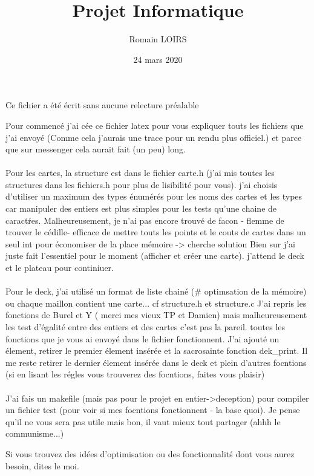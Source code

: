 \documentclass{article}
\title{Projet Informatique}
\author{Romain LOIRS}
\date{24 mars 2020}
\begin{document}
\maketitle
\tableofcontents 

\newpage

Ce fichier a \'et\'e \'ecrit sans aucune relecture pr\'ealable

Pour commenc\'e j'ai c\'ee ce fichier latex pour vous expliquer touts les fichiers que j'ai envoy\'e (Comme cela j'aurais une trace pour un rendu plus officiel.) et parce que sur messenger cela aurait fait (un peu) long.

\paragraph{}
Pour les cartes, la structure est dans le fichier carte.h (j'ai mis toutes les structures dans les fichiers.h pour plus de lisibilit\'e pour vous). j'ai choisis d'utiliser un maximum des types \'enum\'er\'es pour les noms des cartes et les types car manipuler des entiers est plus simples pour les tests qu'une chaine de caract\'res.  Malheureusement, je n'ai pas encore trouv\'e de facon - flemme de trouver le c\'edille- efficace de mettre touts les points et le couts de cartes dans un seul int pour \'economiser de la place m\'emoire -> cherche solution
Bien sur j'ai juste fait l'essentiel pour le moment (afficher et cr\'eer une carte). j'attend le deck et le plateau pour continiuer.

\paragraph{}
Pour le deck, j'ai utilis\'e un format de liste chain\'e (\# optimsation de la m\'emoire) ou chaque maillon contient une carte... cf structure.h et structure.c
J'ai repris les fonctions de Burel  et Y ( merci mes vieux TP et Damien) mais malheureusement les test d'\'egalit\'e entre des entiers et des cartes c'est pas la pareil. toutes les fonctions que je vous ai envoy\'e dans   le fichier fonctionnent. J'ai ajout\'e un \'element, retirer le premier \'element ins\'er\'ee et la sacrosainte fonction dek\_print. Il me reste retirer le dernier \'element ins\'er\'ee dans le deck et plein d'autres focntions (si en lisant les r\'egles vous trouverez des focntions, faites vous plaisir)

\paragraph{}

J'ai fais un makefile (mais pas pour le projet en entier->deception) pour compiler un fichier test (pour voir si mes focntions fonctionnent - la base quoi). Je pense qu'il ne vous sera pas utile mais bon, il vaut mieux tout partager (ahhh le communisme...)

Si vous trouvez des id\'ees d'optimisation ou des fonctionnalit\'s dont vous aurez besoin, dites le moi.
\end{document}
